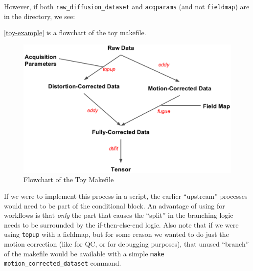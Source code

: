 
However, if both \texttt{raw_diffusion_dataset} and \texttt{acqparams} (and not \texttt{fieldmap}) are in the directory, we see:


\autoref{toy-example} is a flowchart of the toy makefile.

\begin{figure}
	\begin{center}  %
		\includegraphics[width=\textwidth]{../images/distcorr-flowchart.eps}
	\end{center}
	\caption{Flowchart of the Toy Makefile}
	\label{toy-example}
\end{figure}


If we were to implement this process in a \bashn{} script, the earlier
``upstream'' processes would need to be part of the conditional
block. An advantage of using \maken{} for workflows is that
\emph{only} the part that causes the ``split'' in the branching logic
needs to be surrounded by the if-then-else-end logic. Also note that
if we were using \texttt{topup} with a fieldmap, but for some reason
we wanted to do just the motion correction (like for QC, or for
debugging purposes), that unused ``branch'' of the makefile would be
available with a simple \texttt{make motion_corrected_dataset}
command. \newpage


